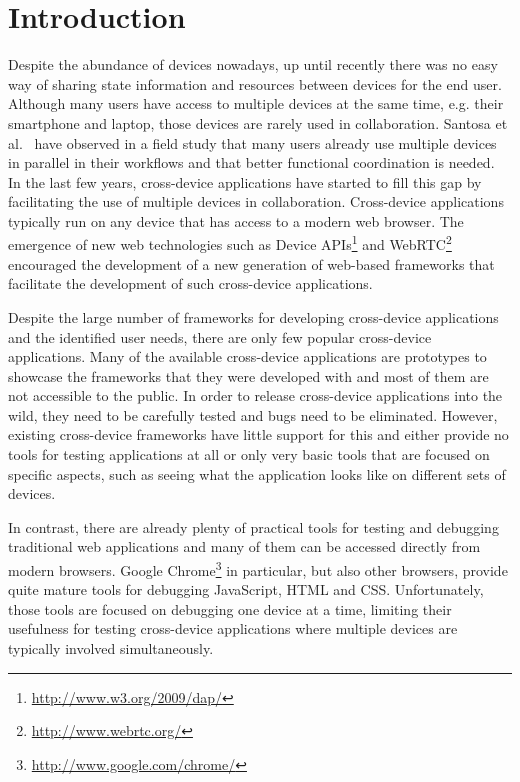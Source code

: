 \chapter{Introduction}

Despite the abundance of devices nowadays, up until recently there was no easy way of sharing state information and resources between devices for the end user. Although many users have access to multiple devices at the same time, e.g. their smartphone and laptop, those devices are rarely used in collaboration. Santosa et al.~\cite{santosa2013} have observed in a field study that many users already use multiple devices in parallel in their workflows and that better functional coordination is needed. In the last few years, cross-device applications have started to fill this gap by facilitating the use of multiple devices in collaboration. Cross-device applications typically run on any device that has access to a modern web browser. The emergence of new web technologies such as Device APIs\footnote{\url{http://www.w3.org/2009/dap/}} and WebRTC\footnote{\url{http://www.webrtc.org/}} encouraged the development of a new generation of web-based frameworks that facilitate the development of such cross-device applications.

Despite the large number of frameworks for developing cross-device applications and the identified user needs, there are only few popular cross-device applications. Many of the available cross-device applications are prototypes to showcase the frameworks that they were developed with and most of them are not accessible to the public. In order to release cross-device applications into the wild, they need to be carefully tested and bugs need to be eliminated. However, existing cross-device frameworks have little support for this and either provide no tools for testing applications at all or only very basic tools that are focused on specific aspects, such as seeing what the application looks like on different sets of devices.

In contrast, there are already plenty of practical tools for testing and debugging traditional web applications and many of them can be accessed directly from modern browsers. Google Chrome\footnote{\url{http://www.google.com/chrome/}} in particular, but also other browsers, provide quite mature tools for debugging JavaScript, HTML and CSS. Unfortunately, those tools are focused on debugging one device at a time, limiting their usefulness for testing cross-device applications where multiple devices are typically involved simultaneously. 

